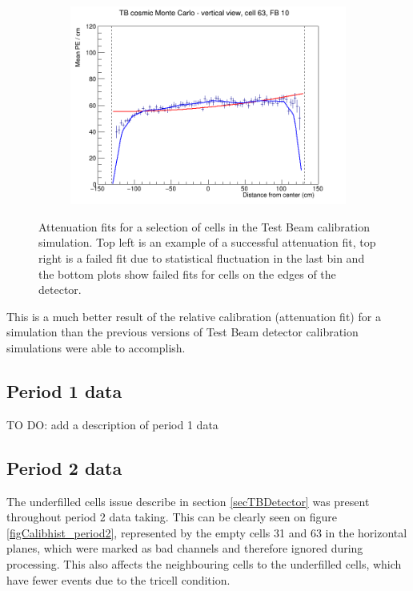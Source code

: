 \documentclass[12pt,a4paper]{article}
\begin{document}
\begin{figure}[h]
\begin{subfigure}{0.5\textwidth}
  \end{subfigure}
  \begin{subfigure}{0.5\textwidth}
    \includegraphics[width=\linewidth]{RelativeCalibrationResults/sim_fb10_000_063.png}
  \end{subfigure}
  \caption{Attenuation fits for a selection of cells in the Test Beam calibration simulation. Top left is an example of a successful attenuation fit, top right is a failed fit due to statistical fluctuation in the last bin and the bottom plots show failed fits for cells on the edges of the detector.}
  \label{figAttenfitResultsSimulation}
\end{figure}

This is a much better result of the relative calibration (attenuation fit) for a simulation than the previous versions of Test Beam detector calibration simulations were able to accomplish.

\subsection{Period 1 data}
TO DO: add a description of period 1 data

\FloatBarrier
\subsection{Period 2 data}
The underfilled cells issue describe in section \ref{secTBDetector} was present throughout period 2 data taking. This can be clearly seen on figure \ref{figCalibhist_period2}, represented by the empty cells 31 and 63 in the horizontal planes, which were marked as bad channels and therefore ignored during processing. This also affects the neighbouring cells to the underfilled cells, which have fewer events due to the tricell condition.
\end{document}
